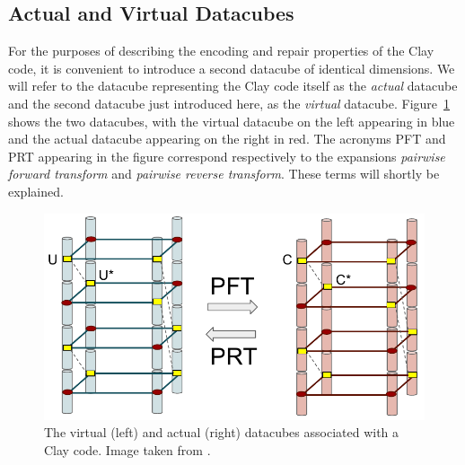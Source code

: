 \begin{multicols}{2}
 \subsection{Actual and Virtual Datacubes} 
 
For the purposes of describing the encoding and repair properties of the Clay code, it is convenient to introduce a second datacube of identical dimensions.  We will refer to the datacube representing the Clay code itself as the {\em actual} datacube and the second datacube just introduced here, as the {\em virtual} datacube.  Figure~\ref{fig:actVirtCubes42} shows the two datacubes, with the virtual datacube on the left appearing in blue and the actual datacube appearing on the right in red.  The acronyms PFT and PRT appearing in the figure correspond respectively to the expansions {\em pairwise forward transform} and {\em pairwise reverse transform}. These terms will shortly be explained. 

\begin{figure}[H]
\centering
\includegraphics[scale=.58]{src/Figures/chap4/actVirtCubes42}  
\caption{The virtual (left) and actual (right) datacubes associated with a Clay code.  Image taken from \cite{VajhaFAST18}. }  \label{fig:actVirtCubes42}    
\end{figure}
 

\end{multicols}
